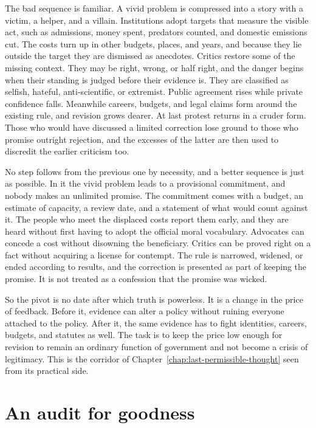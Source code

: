 \documentclass[12pt,a4paper]{book}
\begin{document}
The bad sequence is familiar. A vivid problem is compressed into a story with a victim, a helper, and a villain. Institutions adopt targets that measure the visible act, such as admissions, money spent, predators counted, and domestic emissions cut. The costs turn up in other budgets, places, and years, and because they lie outside the target they are dismissed as anecdotes. Critics restore some of the missing context. They may be right, wrong, or half right, and the danger begins when their standing is judged before their evidence is. They are classified as selfish, hateful, anti-scientific, or extremist. Public agreement rises while private confidence falls. Meanwhile careers, budgets, and legal claims form around the existing rule, and revision grows dearer. At last protest returns in a cruder form. Those who would have discussed a limited correction lose ground to those who promise outright rejection, and the excesses of the latter are then used to discredit the earlier criticism too.

No step follows from the previous one by necessity, and a better sequence is just as possible. In it the vivid problem leads to a provisional commitment, and nobody makes an unlimited promise. The commitment comes with a budget, an estimate of capacity, a review date, and a statement of what would count against it. The people who meet the displaced costs report them early, and they are heard without first having to adopt the official moral vocabulary. Advocates can concede a cost without disowning the beneficiary. Critics can be proved right on a fact without acquiring a license for contempt. The rule is narrowed, widened, or ended according to results, and the correction is presented as part of keeping the promise. It is not treated as a confession that the promise was wicked.

So the pivot is no date after which truth is powerless. It is a change in the price of feedback. Before it, evidence can alter a policy without ruining everyone attached to the policy. After it, the same evidence has to fight identities, careers, budgets, and statutes as well. The task is to keep the price low enough for revision to remain an ordinary function of government and not become a crisis of legitimacy. This is the corridor of Chapter~\ref{chap:last-permissible-thought} seen from its practical side.

\section{An audit for goodness}
\end{document}
